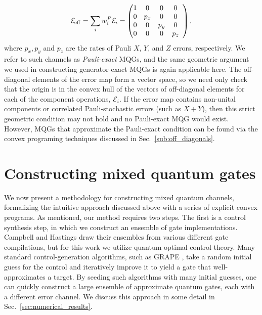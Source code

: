 \documentclass[aps,nofootinbib,pra,notitlepage,twocolumn]{revtex4-1}
\newcommand{\errmat}{\ensuremath{{\mathcal{E}}}}
\newcommand{\0}{\ensuremath{\mathbf{0}}}
\newcommand{\weight}{\ensuremath{w}}
\begin{document}
\begin{equation}
	\errmat_{\rm{eff}} = \sum_i \weight_i^P \errmat_i = 
	\left(\begin{array}{@{}ccccc@{}}
		1 & 0 & 0 & 0 \\ 
    	0 &  p_x & 0 & 0 \\
		0 & 0 &  p_y & 0\\
		0 & 0 & 0 &  p_z\\
	\end{array} 	
	\right),
\end{equation}
where $p_x, p_y$ and $p_z$ are the rates of Pauli $X$, $Y$, and $Z$ errors, respectively. We refer to such channels as \emph{Pauli-exact} MQGs, and the same geometric argument we used in constructing generator-exact MQGs is again applicable here. The off-diagonal elements of the error map form a vector space, so we need only check that the origin is in the convex hull of the vectors of off-diagonal elements for each of the component operations, $\errmat_i$. If the error map contains non-unital components or correlated Pauli-stochastic errors (such as $X+Y$), then this strict geometric condition may not hold and no Pauli-exact MQG would exist. However, MQGs that approximate the Pauli-exact condition can be found via the convex programing techniques discussed in Sec.~\ref{sub:off_diagonals}.


\section{Constructing mixed quantum gates}
\label{sec:mixed_unitary_processes}
\noindent We now present a methodology for constructing mixed quantum channels, formalizing the intuitive approach discussed above with a series of explicit convex programs. As mentioned, our method requires two steps. The first is a control synthesis step, in which we construct an ensemble of gate implementations. Campbell and Hastings draw their ensembles from various different gate compilations, but for this work we utilize quantum optimal control theory. Many standard control-generation algorithms, such as GRAPE \cite{Khaneja2005}, take a random initial guess for the control and iteratively improve it to yield a gate that well-approximates a target. By seeding such algorithms with many initial guesses, one can quickly construct a large ensemble of approximate quantum gates, each with a different error channel. We discuss this approach in some detail in Sec.~\ref{sec:numerical_results}. 
\end{document}
